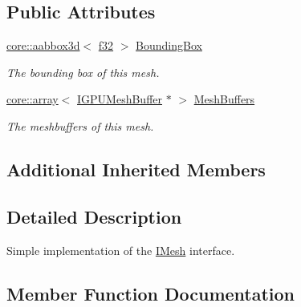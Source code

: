 \subsection*{Public Attributes}
\begin{DoxyCompactItemize}
\item 
\hyperlink{classirr_1_1core_1_1aabbox3d}{core\+::aabbox3d}$<$ \hyperlink{namespaceirr_a0277be98d67dc26ff93b1a6a1d086b07}{f32} $>$ \hyperlink{classirr_1_1scene_1_1SGPUMesh_a67182764e8e4d1fda14b423e5c583ee3}{Bounding\+Box}\hypertarget{classirr_1_1scene_1_1SGPUMesh_a67182764e8e4d1fda14b423e5c583ee3}{}\label{classirr_1_1scene_1_1SGPUMesh_a67182764e8e4d1fda14b423e5c583ee3}

\begin{DoxyCompactList}\small\item\em The bounding box of this mesh. \end{DoxyCompactList}\item 
\hyperlink{classirr_1_1core_1_1array}{core\+::array}$<$ \hyperlink{classirr_1_1scene_1_1IGPUMeshBuffer}{I\+G\+P\+U\+Mesh\+Buffer} $\ast$ $>$ \hyperlink{classirr_1_1scene_1_1SGPUMesh_a9c0fd67b8125f7e0e55317ff92d4963d}{Mesh\+Buffers}\hypertarget{classirr_1_1scene_1_1SGPUMesh_a9c0fd67b8125f7e0e55317ff92d4963d}{}\label{classirr_1_1scene_1_1SGPUMesh_a9c0fd67b8125f7e0e55317ff92d4963d}

\begin{DoxyCompactList}\small\item\em The meshbuffers of this mesh. \end{DoxyCompactList}\end{DoxyCompactItemize}
\subsection*{Additional Inherited Members}


\subsection{Detailed Description}
Simple implementation of the \hyperlink{classirr_1_1scene_1_1IMesh}{I\+Mesh} interface. 

\subsection{Member Function Documentation}

